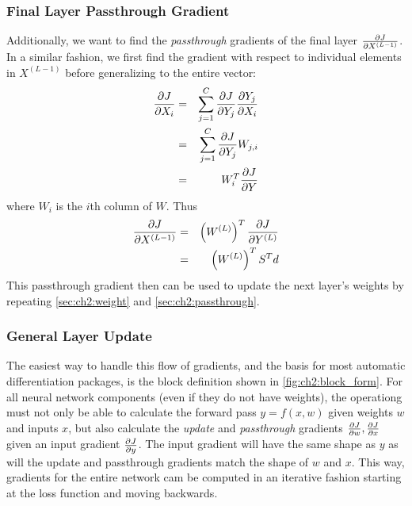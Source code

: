 \subsubsection{Final Layer Passthrough Gradient} \label{sec:ch2:passthrough}
Additionally, we want to find the \emph{passthrough} gradients of the final
layer $\frac{\partial J}{\partial X^{(L-1)}}$. In a similar fashion, we first find the gradient
with respect to individual elements in $X^{(L-1)}$ before generalizing to the
entire vector:
\begin{eqnarray}
  \frac{\partial J}{\partial X_i} &=& \sum_{j=1}^{C} \frac{\partial J}{\partial Y_j} \frac{\partial Y_j}{\partial X_i} \\
                &=& \sum_{j=1}^{C} \frac{\partial J}{\partial Y_j} W_{j,i} \\
                &=& W_{i}^T\frac{\partial J}{\partial Y} \\
\end{eqnarray}
where $W_i$ is the $i$th column of $W$. Thus
\begin{eqnarray}
  \frac{\partial J}{\partial X^{(L-1)}} &=& \left(W^{(L)}\right)^T \frac{\partial J}{\partial Y^{(L)}} \\
                      &=& \left( W^{(L)} \right)^T S^T d
\end{eqnarray}
This passthrough gradient then can be used to update the next layer's weights by
repeating \autoref{sec:ch2:weight} and \autoref{sec:ch2:passthrough}.

\subsubsection{General Layer Update}
The easiest way to handle this flow of gradients, and the basis for most
automatic differentiation packages, is the block definition shown in
\autoref{fig:ch2:block_form}. For all neural network components (even if they do
not have weights), the operationg must not only be able to calculate the forward 
pass $y=f(x, w)$ given weights $w$ and inputs $x$, but also calculate the
\emph{update} and \emph{passthrough} gradients $\frac{\partial J}{\partial w}, \frac{\partial J}{\partial x}$ given
an input gradient $\frac{\partial J}{\partial y}$. The input gradient will have the same shape as
$y$ as will the update and passthrough gradients match the shape of $w$ and $x$.
This way, gradients for the entire network cam be computed in an iterative
fashion starting at the loss function and moving backwards.

\begin{figure}
  \centering
  
  \label{fig:ch2:block_form}
\end{figure}

